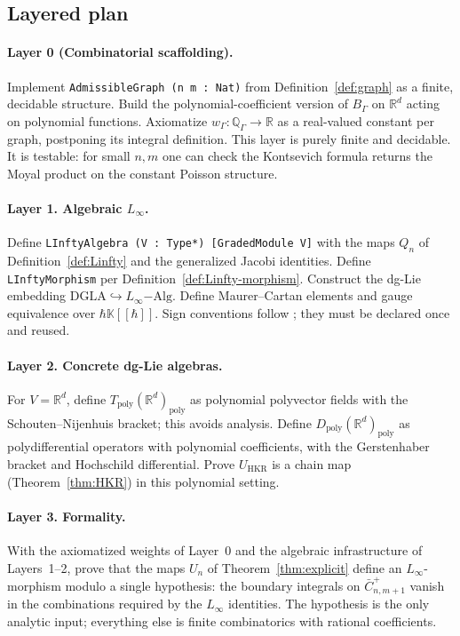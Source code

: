 \documentclass[11pt,a4paper]{article}
\theoremstyle{definition}
\newcommand{\R}{\mathbb{R}}
\newcommand{\K}{\mathbb{K}}
\newcommand{\Tpoly}{T_{\mathrm{poly}}}
\newcommand{\Dpoly}{D_{\mathrm{poly}}}
\begin{document}
\endgroup

\subsection{Layered plan}\label{ssec:plan}

\paragraph{Layer 0 (Combinatorial scaffolding).}
Implement \texttt{AdmissibleGraph (n m : Nat)} from
Definition~\ref{def:graph} as a finite, decidable structure. Build the
polynomial-coefficient version of $B_{\Gamma}$ on $\R^{d}$ acting on
polynomial functions. Axiomatize $w_{\Gamma} : \mathbb{Q}_{\Gamma} \to \R$
as a real-valued constant per graph, postponing its integral definition.
This layer is purely finite and decidable. It is testable: for small
$n, m$ one can check the Kontsevich formula returns the Moyal product
on the constant Poisson structure.

\paragraph{Layer 1. Algebraic $L_\infty$.}
Define \texttt{LInftyAlgebra (V : Type*) [GradedModule V]} with the
maps $Q_{n}$ of Definition~\ref{def:Linfty} and the generalized Jacobi
identities. Define \texttt{LInftyMorphism} per
Definition~\ref{def:Linfty-morphism}. Construct the dg-Lie embedding
$\mathrm{DGLA} \hookrightarrow L_\infty\mathrm{-Alg}$. Define Maurer--Cartan
elements and gauge equivalence over $\hbar \K[[\hbar]]$.
Sign conventions follow \cite[\S4]{Kontsevich2003}; they must be
declared once and reused.

\paragraph{Layer 2. Concrete dg-Lie algebras.}
For $V = \R^{d}$, define $\Tpoly(\R^{d})_{\mathrm{poly}}$ as polynomial
polyvector fields with the Schouten--Nijenhuis bracket; this avoids
analysis. Define $\Dpoly(\R^{d})_{\mathrm{poly}}$ as polydifferential
operators with polynomial coefficients, with the Gerstenhaber bracket
and Hochschild differential. Prove $U_{\mathrm{HKR}}$ is a chain map
(Theorem~\ref{thm:HKR}) in this polynomial setting.

\paragraph{Layer 3. Formality.}
With the axiomatized weights of Layer~0 and the algebraic infrastructure
of Layers~1--2, prove that the maps $U_{n}$ of Theorem~\ref{thm:explicit}
define an $L_\infty$-morphism modulo a single hypothesis: the boundary
integrals on $\bar C_{n,m+1}^{+}$ vanish in the combinations required
by the $L_\infty$ identities. The hypothesis is the only analytic
input; everything else is finite combinatorics with rational
coefficients.
\end{document}
